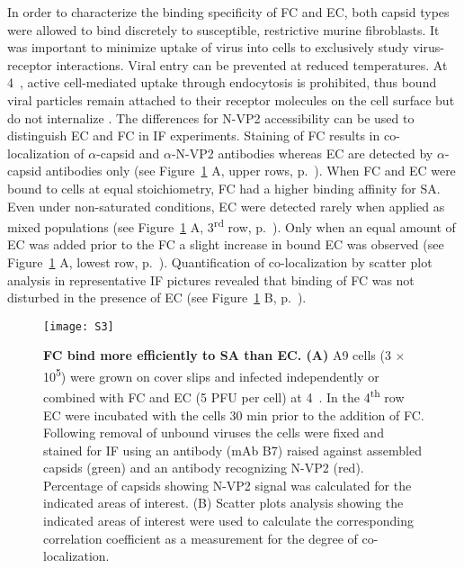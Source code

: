 In order to characterize the binding specificity of FC and EC, both capsid types were allowed to bind discretely to susceptible, restrictive murine fibroblasts. It was important to minimize uptake of virus into cells to exclusively study virus-receptor interactions. Viral entry can be prevented at reduced temperatures. At \mbox{4~\textcelsius}, active cell-mediated uptake through endocytosis is prohibited, thus bound viral particles remain attached to their receptor molecules on the cell surface but do not internalize \cite{pmid20517}. The differences for N-VP2 accessibility can be used to distinguish EC and FC in IF experiments. Staining of FC results in co-localization of $\alpha$-capsid and $\alpha$-N-VP2 antibodies whereas EC are detected by $\alpha$-capsid antibodies only (see Figure~\ref{S3} A, upper rows, p.~\pageref{S3}). When FC and EC were bound to cells at equal stoichiometry, FC had a higher binding affinity for SA. Even under non-saturated conditions, EC were detected rarely when applied as mixed populations (see Figure~\ref{S3} A, 3\textsuperscript{rd} row, p.~\pageref{S3}). Only when an equal amount of EC was added prior to the FC a slight increase in bound EC was observed (see Figure~\ref{S3} A, lowest row, p.~\pageref{S3}). Quantification of co-localization by scatter plot analysis in representative IF pictures revealed that binding of FC was not disturbed in the presence of EC (see Figure~\ref{S3} B, p.~\pageref{S3}).             








\begin{figure}
\centering
  \texttt{[image: S3]} \\[0.35 cm]
  \caption[Full Capsids Bind More Efficiently to Sialic Acid than Empty Capsids]
   {\textbf{FC bind more efficiently to SA than EC. (A)} A9 cells (3 $\times$ 10\textsuperscript{5}) were grown on cover slips and infected independently or combined with FC and EC (5 PFU per cell) at \mbox{4 \textcelsius}. In the 4\textsuperscript{th} row EC were incubated with the cells 30 min prior to the addition of FC. Following removal of unbound viruses the cells were fixed and stained for IF using an antibody (mAb B7) raised against assembled capsids (green) and an antibody recognizing N-VP2 (red). Percentage of capsids showing N-VP2 signal was calculated for the indicated areas of interest. (B) Scatter plots analysis showing the indicated areas of interest were used to calculate the corresponding correlation coefficient as a measurement for the degree of co-localization.} 
\label{S3}
\end{figure}



